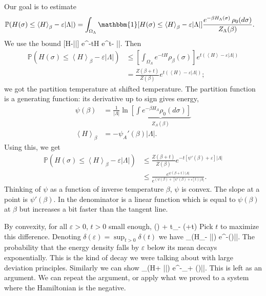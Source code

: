 Our goal is to estimate 
\begin{align*}
\mathbb{P}(H(\sigma)\le \left\langle {H}\right\rangle_\beta - \varepsilon |\Lambda|)
&=\int_{\Omega_\Lambda} \mathbbm{1}[H(\sigma)\le \left\langle {H}\right\rangle_\beta - \varepsilon |\Lambda|] \frac{e^{-\beta H_\Lambda(\sigma)}\,\rho_0(d\sigma)}{Z_{\Lambda}(\beta)}.
\end{align*}
We use the bound 
\be
{}[H\le \left{}\right\rangle-\varepsilon |\Lambda|] \le e^{-tH} e^{t\left{}\right\rangle - \varepsilon|\Lambda|}.
\ee
Then 
\begin{align*}
\mathbb{P}(H(\sigma)\le \left\langle {H}\right\rangle_\beta - \varepsilon |\Lambda|)
&\le \left[ {\int_{\Omega_\Lambda} e^{-tH}\rho_{\beta}(\sigma)} \right] e^{t(\left\langle {H}\right\rangle-\varepsilon|\Lambda|)}\\
&= \frac{Z(\beta+t)}{Z(\beta)}e^{t(\left\langle {H}\right\rangle-\varepsilon|\Lambda|)};
\end{align*}
we got the partition temperature at shifted temperature.
The partition function is a generating function: its derivative up to sign gives energy,
\begin{align*}
\psi(\beta) &= \frac{1}{|\Lambda|}\ln \underbrace{\left[ { \int e^{-\beta H_\Lambda} \rho_0(d\sigma)} \right]}_{Z_{\Lambda}(\beta)}\\
\left\langle {H}\right\rangle_\beta &= -\psi_A'(\beta) |\Lambda|.
\end{align*}
Using this, we get
\begin{align*}
\mathbb{P}(H(\sigma)\le \left\langle {H}\right\rangle_\beta - \varepsilon |\Lambda|)&\le 
\frac{Z(\beta+t)}{Z(\beta)}e^{-t[\psi'(\beta)+\varepsilon]|\Lambda|}\\
&\le \frac{e^{\psi(\beta+t)|\Lambda|}}{e^{(\psi(\beta) + [\psi'(\beta) + \varepsilon]t)|\Lambda|}}.%
\end{align*}
Thinking of $\psi$ as a function of inverse temperature $\beta$, $\psi$ is convex. The slope at a point is $\psi'(\beta)$. In the denominator is a linear function which is equal to $\psi(\beta)$ at $\beta$ but increases a bit faster than the tangent line.

By convexity, for all $\varepsilon>0$, $t>0$ small enough, %
\be
\psi(\beta) + t_ - \psi(\beta+t) 
\ee
Pick $t$ to maximize this difference. Denoting $\delta(\varepsilon)=\sup_{t>0}\delta(t)$ we have
\be
{}_\beta (H_\Lambda\le \left{}\right\rangle - \varepsilon|\Lambda|) \le e^{-\delta (\varepsilon)|\Lambda|}.
\ee
The probability that the energy density falls by $\varepsilon$ below its mean decays exponentially. This is the kind of decay we were talking about with large deviation principles.
Similarly we can show 
\be
{}_\beta (H\ge \left{}\right\rangle + \varepsilon|\Lambda|) \le e^{-\delta_+ (\varepsilon)|\Lambda|}.
\ee
This is left as an argument. 
We can repeat the argument, or apply what we proved to a system where the Hamiltonian is the negative.

